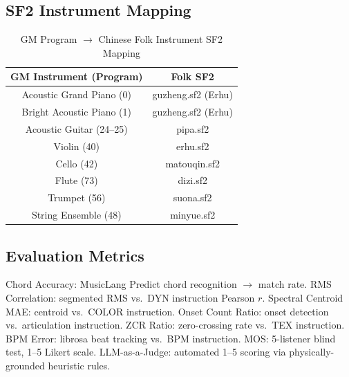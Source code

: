 \documentclass[11pt,twocolumn]{article}
\begin{document}
\subsection{SF2 Instrument Mapping}
\begin{table}[H]
\centering\footnotesize
\caption{GM Program $\rightarrow$ Chinese Folk Instrument SF2 Mapping}
\begin{tabular}{c|c}
\toprule
GM Instrument (Program) & Folk SF2 \\
\midrule
Acoustic Grand Piano (0) & guzheng.sf2 (Erhu) \\
Bright Acoustic Piano (1) & guzheng.sf2 (Erhu) \\
Acoustic Guitar (24--25) & pipa.sf2 \\
Violin (40) & erhu.sf2 \\
Cello (42) & matouqin.sf2 \\
Flute (73) & dizi.sf2 \\
Trumpet (56) & suona.sf2 \\
String Ensemble (48) & minyue.sf2 \\
\bottomrule
\end{tabular}
\end{table}

\subsection{Evaluation Metrics}
Chord Accuracy: MusicLang Predict chord recognition $\rightarrow$ match rate. RMS Correlation: segmented RMS vs.\ DYN instruction Pearson $r$. Spectral Centroid MAE: centroid vs.\ COLOR instruction. Onset Count Ratio: onset detection vs.\ articulation instruction. ZCR Ratio: zero-crossing rate vs.\ TEX instruction. BPM Error: librosa beat tracking vs.\ BPM instruction. MOS: 5-listener blind test, 1--5 Likert scale. LLM-as-a-Judge: automated 1--5 scoring via physically-grounded heuristic rules.
\end{document}

